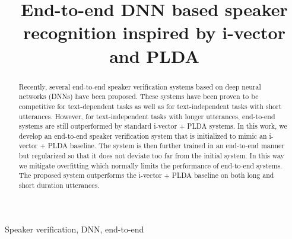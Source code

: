 \documentclass{article}
\title{End-to-end DNN based speaker recognition inspired by i-vector and PLDA}
\begin{document}
\ninept
%
\maketitle
%
\begin{abstract}
Recently, several end-to-end speaker verification systems based on deep neural networks (DNNs) have been proposed. These systems have been proven to be competitive for text-dependent tasks as well as for text-independent tasks with short utterances. However, for text-independent tasks with longer utterances, end-to-end systems are still outperformed by standard i-vector + PLDA systems. In this work, we develop an end-to-end speaker verification system that is initialized to mimic an i-vector + PLDA baseline. The system is then further trained in an end-to-end manner but regularized so that it does not deviate too far from the initial system. In this way we mitigate overfitting which normally limits the performance of end-to-end systems. The proposed system outperforms the i-vector + PLDA baseline on both long and short duration utterances. 
\end{abstract}
%
\begin{keywords}
Speaker verification, DNN, end-to-end
\end{keywords}
%
\end{document}
